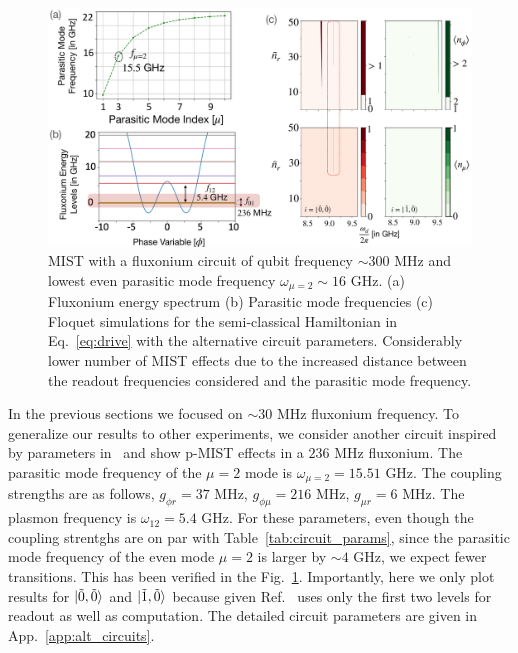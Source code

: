 \documentclass[prx,showpacs,notitlepage,twocolumn,superscriptaddress,nofootinbib,preprintnumbers,floatfix]{revtex4-2}
\begin{document}
\begin{figure}[htb]
    \centering
    \includegraphics[width=\linewidth]{Figures/Floquet1.pdf}
    \caption{MIST with a fluxonium circuit of qubit frequency $\sim 300$ MHz and lowest even parasitic mode frequency $\omega_{\mu=2}\sim 16$ GHz. (a) Fluxonium energy spectrum (b) Parasitic mode frequencies (c) Floquet simulations for the semi-classical Hamiltonian in Eq.~\ref{eq:drive} with the alternative circuit parameters. Considerably lower number of MIST effects due to the increased distance between the readout frequencies considered and the parasitic mode frequency.}
    \label{fig:Floquet1}
\end{figure}

In the previous sections we focused on $\sim 30$ MHz fluxonium frequency. To generalize our results to other experiments, we consider another circuit inspired by parameters in~\cite{ding_high-fidelity_2023} and show p-MIST effects in a $236$ MHz fluxonium. The parasitic mode frequency of the $\mu=2$ mode is $\omega_{\mu=2}=15.51$ GHz. The coupling strengths are as follows, $g_{\phi r}=37$ MHz, $g_{\phi\mu}=216$ MHz, $g_{\mu r}=6$ MHz. The plasmon frequency is $\omega_{12}=5.4$ GHz. For these parameters, even though the coupling strentghs are on par with Table~\ref{tab:circuit_params}, since the parasitic mode frequency of the even mode $\mu=2$ is larger by $\sim 4$ GHz, we expect fewer transitions. This has been verified in the Fig.~\ref{fig:Floquet1}. Importantly, here we only plot results for $\ket{\tilde{0},\tilde{0}}$ and $\ket{\tilde{1},\tilde{0}}$ because given Ref.~\cite{ding_high-fidelity_2023} uses only the first two levels for readout as well as computation. The detailed circuit parameters are given in App.~\ref{app:alt_circuits}. 
\end{document}
